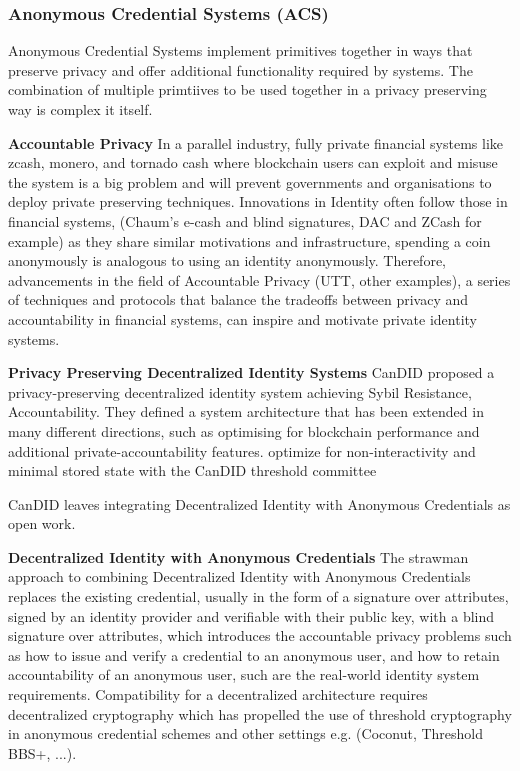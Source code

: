 \subsubsection{Anonymous Credential Systems (ACS)} 
Anonymous Credential Systems implement primitives together in ways that preserve privacy and offer additional functionality required by systems. The combination of multiple primtiives to be used together in a privacy preserving way is complex it itself. 

\noindent \textbf{Accountable Privacy}
In a parallel industry, fully private financial systems like zcash, monero, and tornado cash where blockchain users can exploit and misuse the system is a big problem and will prevent governments and organisations to deploy private preserving techniques. Innovations in Identity often follow those in financial systems, (Chaum's e-cash and blind signatures, DAC and ZCash for example) as they share similar motivations and infrastructure, spending a coin anonymously is analogous to using an identity anonymously. Therefore, advancements in the field of Accountable Privacy (UTT, other examples), a series of techniques and protocols that balance the tradeoffs between privacy and accountability in financial systems, can inspire and motivate private identity systems.

\noindent \textbf{Privacy Preserving Decentralized Identity Systems}
CanDID proposed a privacy-preserving decentralized identity system achieving Sybil Resistance, Accountability. 
They defined a system architecture that has been extended in many different directions, such as \cite{wang2023hades, rathee_zebra_2022} optimising for blockchain performance and additional private-accountability features. \cite{crites_syra_2024, rabaninejad_attribute-based_nodate} optimize for non-interactivity and minimal stored state with the CanDID threshold committee

CanDID leaves integrating Decentralized Identity with Anonymous Credentials as open work.

\noindent \textbf{Decentralized Identity with Anonymous Credentials}
The strawman approach to combining Decentralized Identity with Anonymous Credentials replaces the existing credential, usually in the form of a signature over attributes, signed by an identity provider and verifiable with their public key, with a blind signature over attributes, which introduces the accountable privacy problems such as how to issue and verify a credential to an anonymous user, and how to retain accountability of an anonymous user, such are the real-world identity system requirements. 
Compatibility for a decentralized architecture requires decentralized cryptography which has propelled the use of threshold cryptography in anonymous credential schemes and other settings e.g. (Coconut, Threshold BBS+, ...). 


